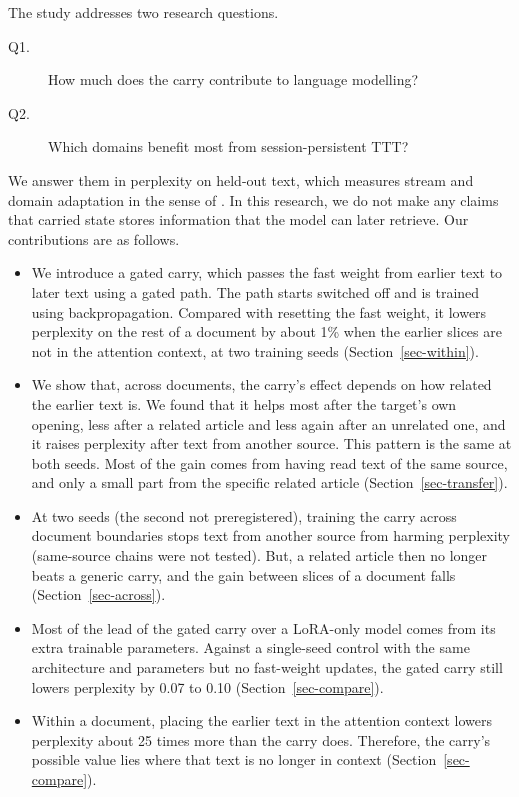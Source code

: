 \documentclass[12pt,a4paper]{report}
\begin{document}
The study addresses two research questions.
\begin{description}
  \item[Q1.] How much does the carry contribute to language modelling?
  \item[Q2.] Which domains benefit most from session-persistent TTT?
\end{description}
We answer them in perplexity on held-out text, which measures stream and domain adaptation in the sense of \citet{song2026beyond}. In this research, we do not make any claims that carried state stores information that the model can later retrieve. Our contributions are as follows.
\begin{itemize}
  \item We introduce a gated carry, which passes the fast weight from earlier text to later text using a gated path. The path starts switched off and is trained using backpropagation. Compared with resetting the fast weight, it lowers perplexity on the rest of a document by about 1\% when the earlier slices are not in the attention context, at two training seeds (Section~\ref{sec-within}).
  \item We show that, across documents, the carry's effect depends on how related the earlier text is. We found that it helps most after the target's own opening, less after a related article and less again after an unrelated one, and it raises perplexity after text from another source. This pattern is the same at both seeds. Most of the gain comes from having read text of the same source, and only a small part from the specific related article (Section~\ref{sec-transfer}).
  \item At two seeds (the second not preregistered), training the carry across document boundaries stops text from another source from harming perplexity (same-source chains were not tested). But, a related article then no longer beats a generic carry, and the gain between slices of a document falls (Section~\ref{sec-across}).
\item Most of the lead of the gated carry over a LoRA-only model comes from its extra trainable parameters. Against a single-seed control with the same architecture and parameters but no fast-weight updates, the gated carry still lowers perplexity by 0.07 to 0.10 (Section~\ref{sec-compare}).
\item Within a document, placing the earlier text in the attention context lowers perplexity about 25 times more than the carry does. Therefore, the carry's possible value lies where that text is no longer in context (Section~\ref{sec-compare}).
\end{itemize}
\end{document}
